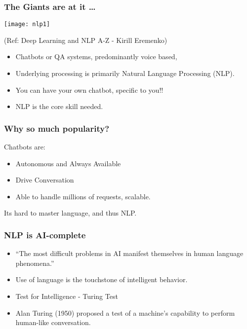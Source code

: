 \begin{frame}[fragile]\frametitle{The Giants are at it \ldots}
\begin{center}
\texttt{[image: nlp1]}

\tiny{(Ref: Deep Learning and NLP A-Z - Kirill Eremenko)}
\end{center}

	\begin{itemize}
	\item Chatbots or QA systems, predominantly voice based, 
	\item Underlying processing is primarily Natural Language Processing (NLP).
	\item You can have your own chatbot, specific to you!! 
	\item NLP is the core skill needed.
	\end{itemize}
	
\end{frame}


\begin{frame}[fragile]\frametitle{Why so much popularity?}
Chatbots are:
	\begin{itemize}
	\item Autonomous and Always Available
	\item Drive Conversation
	\item Able to handle millions of requests, scalable.
	\end{itemize}
	
Its hard to master language, and thus NLP.
\end{frame}


\begin{frame}[fragile]\frametitle{NLP is AI-complete}

	\begin{itemize}
	\item ``The most difficult problems in AI manifest themselves in human language phenomena.''
	\item Use of language is the touchstone of intelligent behavior.
	\item Test for Intelligence - Turing Test
	\item Alan Turing (1950) proposed a test of a machine's capability to perform human-like conversation.
	\end{itemize}
\end{frame}


